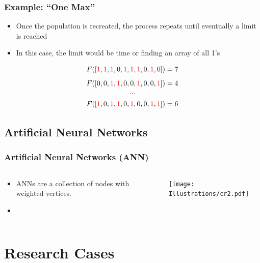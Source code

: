 \documentclass{beamer}
\begin{document}
\begin{frame}
  \frametitle{Example: ``One Max''}
\begin{itemize}
  \item Once the population is recreated, the process repeats until eventually a limit is reached
  \item In this case, the limit would be time or finding an array of all 1's
\end{itemize}
\[
F([ \textcolor{red}{1},  \textcolor{red}{1}, \textcolor{red}{1}, 0, \textcolor{red}{1}, \textcolor{red}{1}, \textcolor{red}{1}, 0, \textcolor{red}{1}, 0 ]) = 7
\]
\[F([  0, 0, \textcolor{red}{1}, \textcolor{red}{1}, 0,  0, \textcolor{red}{1}, 0, 0, \textcolor{red}{1} ]) = 4
\]
\[\cdots\]
\[F([  \textcolor{red}{1}, 0, \textcolor{red}{1}, \textcolor{red}{1}, 0,  \textcolor{red}{1}, 0, 0, \textcolor{red}{1}, \textcolor{red}{1} ]) = 6
\]
\end{frame}

\subsection{Artificial Neural Networks}
\begin{frame}
  \frametitle{Artificial Neural Networks (ANN)}
\begin{columns}
  \begin{column}{0.5\textwidth}
\begin{itemize}
\item  ANNs are a collection of nodes with weighted vertices.
\item 
\end{itemize}
\end{column}
\begin{column}{0.5\textwidth}
 \texttt{[image: Illustrations/cr2.pdf]}
       \\
\end{column}
\end{columns}
\end{frame}

\section{Research Cases}
\end{document}
